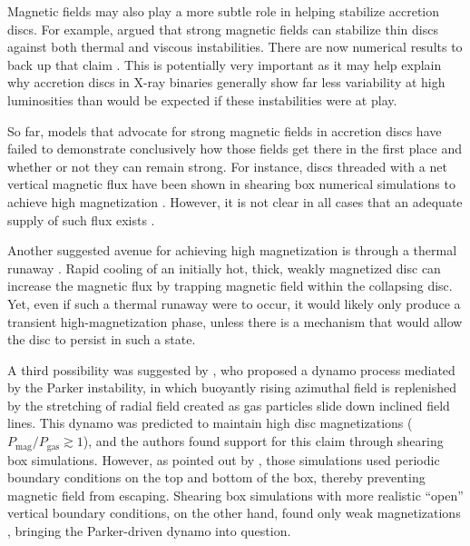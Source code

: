 \documentclass[useAMS,usenatbib]{mn2e}
\def\pmpg{P_\mathrm{mag}/P_\mathrm{gas}}
\begin{document}
Magnetic fields may also play a more subtle role in helping stabilize accretion discs.  For example, \citet{Begelman07} \citep[also][]{Oda09} argued that strong magnetic fields can stabilize thin discs against both thermal and viscous instabilities.  There are now numerical results to back up that claim \citep{Sadowski16}.  This is potentially very important as it may help explain why accretion discs in X-ray binaries generally show far less variability at high luminosities than would be expected if these instabilities were at play.

So far, models that advocate for strong magnetic fields in accretion discs have failed to demonstrate conclusively how those fields get there in the first place and whether or not they can remain strong.  For instance, discs threaded with a net vertical magnetic flux have been shown in shearing box numerical simulations to achieve high magnetization \citep[$\pmpg \ge 1$;][]{Bai13,Salvesen16a}.  However, it is not clear in all cases that an adequate supply of such flux exists \citep{Sadowski16b}.

Another suggested avenue for achieving high magnetization is through a thermal runaway \citep{Pariev03, Machida06,Fragile09}.  Rapid cooling of an initially hot, thick, weakly magnetized disc can increase the magnetic flux by trapping magnetic field within the collapsing disc.  Yet, even if such a thermal runaway were to occur, it would likely only produce a transient high-magnetization phase, unless there is a mechanism that would allow the disc to persist in such a state.

A third possibility was suggested by \citet{Johansen08}, who proposed a dynamo process mediated by the Parker instability, in which buoyantly rising azimuthal field is replenished by the stretching of radial field created as gas particles slide down inclined field lines.  This dynamo was predicted to maintain high disc magnetizations ($\pmpg \gtrsim 1$), and the authors found support for this claim through shearing box simulations.  However, as pointed out by \citet{Salvesen16}, those simulations used periodic boundary conditions on the top and bottom of the box, thereby preventing magnetic field from escaping.  Shearing box simulations with more realistic ``open'' vertical boundary conditions, on the other hand, found only weak magnetizations \citep[$\pmpg \lesssim 0.1$;][]{Salvesen16}, bringing the Parker-driven dynamo into question.  
\end{document}
